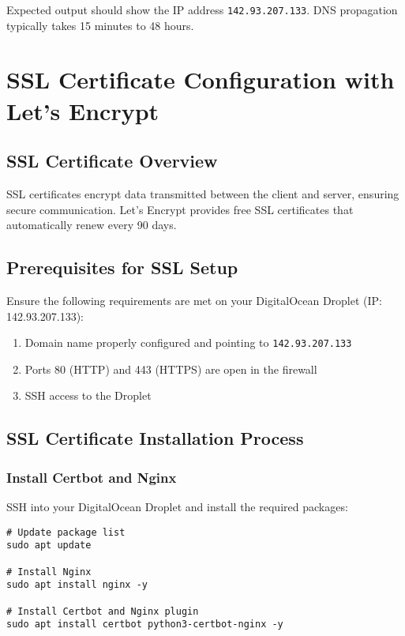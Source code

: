 Expected output should show the IP address \texttt{142.93.207.133}. DNS propagation typically takes 15 minutes to 48 hours.

\section{SSL Certificate Configuration with Let's Encrypt}

\subsection{SSL Certificate Overview}

SSL certificates encrypt data transmitted between the client and server, ensuring secure communication. Let's Encrypt provides free SSL certificates that automatically renew every 90 days.

\subsection{Prerequisites for SSL Setup}

Ensure the following requirements are met on your DigitalOcean Droplet (IP: 142.93.207.133):

\begin{enumerate}
    \item Domain name properly configured and pointing to \texttt{142.93.207.133}
    \item Ports 80 (HTTP) and 443 (HTTPS) are open in the firewall
    \item SSH access to the Droplet
\end{enumerate}

\subsection{SSL Certificate Installation Process}

\subsubsection{Install Certbot and Nginx}

SSH into your DigitalOcean Droplet and install the required packages:

\begin{verbatim}
# Update package list
sudo apt update

# Install Nginx
sudo apt install nginx -y

# Install Certbot and Nginx plugin
sudo apt install certbot python3-certbot-nginx -y
\end{verbatim}

